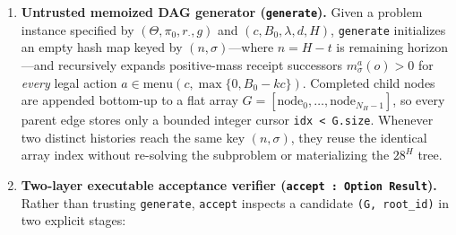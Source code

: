 \documentclass[11pt,a4paper]{article}
\providecommand{\tightlist}{\setlength{\itemsep}{2pt}\setlength{\parskip}{0pt}}
\begin{document}
\begin{enumerate}
\def\labelenumi{\arabic{enumi}.}
\tightlist
\item
  \textbf{Untrusted memoized DAG generator (\texttt{generate}).} Given a
  problem instance specified by \((\Theta, \pi_0, r_\cdot, g)\) and
  \((c, B_0, \lambda, d, H)\), \texttt{generate} initializes an empty
  hash map keyed by \((n, \sigma)\)---where \(n = H - t\) is remaining
  horizon---and recursively expands positive-mass receipt successors
  \(m_\sigma^a(o) > 0\) for \emph{every} legal action
  \(a \in \mathrm{menu}(c, \max\{0, B_0 - kc\})\). Completed child nodes
  are appended bottom-up to a flat array
  \(G = [\mathrm{node}_0, \dots, \mathrm{node}_{N_H - 1}]\), so every
  parent edge stores only a bounded integer cursor
  \texttt{idx\ \textless{}\ G.size}. Whenever two distinct histories
  reach the same key \((n, \sigma)\), they reuse the identical array
  index without re-solving the subproblem or materializing the \(28^H\)
  tree.
\item
  \textbf{Two-layer executable acceptance verifier
  (\texttt{accept\ :\ Option\ Result}).} Rather than trusting
  \texttt{generate}, \texttt{accept} inspects a candidate
  \texttt{(G,\ root\_id)} in two explicit stages:


\end{enumerate}
\end{document}
